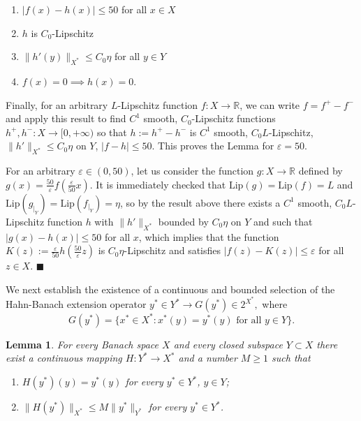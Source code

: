 \documentclass[11pt]{amsproc}%
\theoremstyle{plain}
\newtheorem{lemma}{Lemma}
\numberwithin{equation}{section}
\begin{document}
\begin{enumerate}
\item $|f(x)-h(x)|\leq 50$ for all $x\in X$

\item $h$ is $C_{0}$-Lipschitz

\item $\|h'(y)\|_{X^{*}}\leq C_0 \eta$ for all $y\in Y$

\item $f(x)=0 \implies h(x)=0$.
\end{enumerate}

Finally, for an arbitrary $L$-Lipschitz function
$f:X\to\mathbb{R}$, we can
write $f=f^{+} - f^{-}$ and apply this result to find $C^{1}$ smooth, $C_{0}%
$-Lipschitz functions $h^{+}, h^{-} :X\to[0, +\infty)$ so that
$h:=h^{+}- h^{-}$ is $C^{1}$ smooth, $C_{0} L$-Lipschitz,
$\|h'\|_{X^{*}}\leq C_0 \eta$ on $Y$, $|f-h|\leq 50$. This proves
the Lemma for $\varepsilon=50$.

For an arbitrary $\varepsilon \in (0,50)$, let us consider the
function $g:X\rightarrow\mathbb{R}$ defined by
$g(x)=\frac{50}{\varepsilon}f(\frac{\varepsilon}{50} x)$. It is
immediately checked that $\textrm{Lip}(g)=\textrm{Lip}(f)=L$ and
$\textrm{Lip}(g_{|_Y})=\textrm{Lip}(f_{|_Y})=\eta$, so by the
result above there exists a $C^{1}$ smooth, $C_{0} L$-Lipschitz
function $h$ with $\|h'\|_{X^{*}}$ bounded by $C_0 \eta$ on $Y$
and such that $|g(x)-h(x)|\leq 50$ for all $x$, which implies that
the function $K(z):=\frac{\varepsilon}{50} h(\frac{50
}{\varepsilon}z)$ is $C_{0}\eta$-Lipschitz and satisfies
$|f(z)-K(z)|\leq \varepsilon$ for all $z\in X$. $\blacksquare$

\bigskip

\noindent We next establish the existence of a continuous and bounded
selection of the Hahn-Banach extension operator $y^{\ast}\in Y^{\ast
}\rightarrow G(y^{\ast})\in2^{X^{\ast}},$ where%
\[
G(y^{\ast})=\{x^{\ast}\in X^{\ast}:x^{\ast}(y)=y^{\ast}(y)\text{ for all }y\in
Y\}.
\]


\begin{lemma}
\label{existence of extension operators} For every Banach space $X$ and every
closed subspace $Y\subset X$ there exist a continuous mapping $H:Y^{\ast
}\rightarrow X^{\ast}$ and a number $M\geq1$ such that

\begin{enumerate}
\item $H(y^{*})(y)=y^{*}(y)$ for every $y^{*}\in Y^{*}$, $y\in Y$;

\item $\|H(y^{*})\|_{X^{*}}\leq M\|y^{*}\|_{Y^{*}}$ for every $y^{*}\in Y^{*}
$.
\end{enumerate}
\end{lemma}
\end{document}
